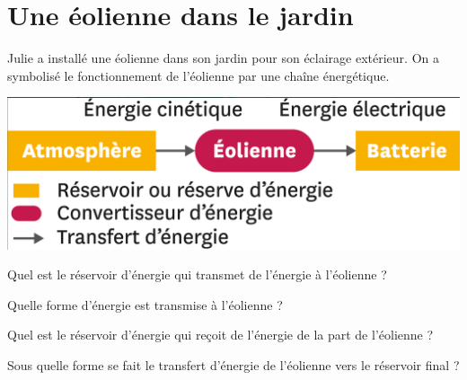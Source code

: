 \section{Une éolienne dans le jardin}\label{ex:eolienne}
	
Julie a installé une éolienne dans son jardin pour son éclairage extérieur. On a symbolisé le fonctionnement de l'éolienne par une chaîne énergétique.

\begin{center}
	\includegraphics[scale=0.2]{img/chaine}
\end{center}

\begin{questions}
	\question Quel est le réservoir d'énergie qui transmet de l'énergie à l'éolienne ?
	
	\question Quelle forme d'énergie est transmise à l'éolienne ?
	
	
	\question Quel est le réservoir d'énergie qui reçoit de l'énergie de la part de l'éolienne ?
	
	\question Sous quelle forme se fait le transfert d'énergie de l'éolienne vers le réservoir final ?
\end{questions}